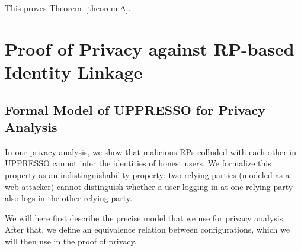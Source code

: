 \begin{theorem}
  
  This proves Theorem~\ref{theorem:A}.\QED
  
  \section{Proof of Privacy against RP-based Identity Linkage}
  
  \subsection{Formal Model of UPPRESSO for Privacy Analysis}
  
  In our privacy analysis, we show that malicious RPs colluded 
  with each other in UPPRESSO cannot infer the identities of 
  honest users. We formalize this property as an 
  indistinguishability property: two relying parties (modeled as 
  a web attacker) cannot distinguish whether a user logging in 
  at one relying party also logs in the other relying party.
  
  We will here first describe the precise model that we use for 
  privacy analysis. After that, we define an equivalence 
  relation between configurations, which we will then use in the 
  proof of privacy.
  

\end{theorem}
